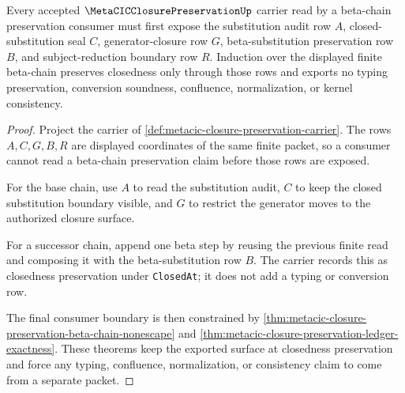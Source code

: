\begin{theorem}
\label{thm:metacic-closure-preservation-generator-substitution-induction}
Every accepted $\MetaCICClosurePreservationUp$ carrier read by a beta-chain preservation consumer must first expose the substitution audit row $A$, closed-substitution seal $C$, generator-closure row $G$, beta-substitution preservation row $B$, and subject-reduction boundary row $R$. Induction over the displayed finite beta-chain preserves closedness only through those rows and exports no typing preservation, conversion soundness, confluence, normalization, or kernel consistency.
\end{theorem}
\begin{proof}
Project the carrier of \autoref{def:metacic-closure-preservation-carrier}. The rows $A,C,G,B,R$ are displayed coordinates of the same finite packet, so a consumer cannot read a beta-chain preservation claim before those rows are exposed.

For the base chain, use $A$ to read the substitution audit, $C$ to keep the closed substitution boundary visible, and $G$ to restrict the generator moves to the authorized closure surface.

For a successor chain, append one beta step by reusing the previous finite read and composing it with the beta-substitution row $B$. The carrier records this as closedness preservation under \texttt{ClosedAt}; it does not add a typing or conversion row.

The final consumer boundary is then constrained by \autoref{thm:metacic-closure-preservation-beta-chain-nonescape} and \autoref{thm:metacic-closure-preservation-ledger-exactness}. These theorems keep the exported surface at closedness preservation and force any typing, confluence, normalization, or consistency claim to come from a separate packet.
\end{proof}

